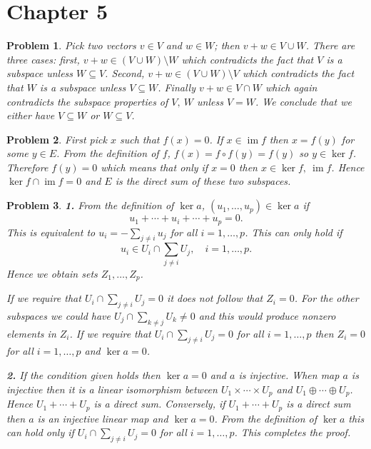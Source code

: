 \documentclass{article}
\newcommand{\subno}[1]{\par\noindent\textbf{#1}}
\DeclareMathOperator{\im}{im}
\theoremstyle{pprop}
\newtheorem{problem}{Problem}[section]
\begin{document}
\section*{Chapter 5}
\begin{problem}
  Pick two vectors $v \in V$ and $w \in W$; then $v+w \in V \cup W$. There are three cases: first, $v+w \in (V \cup W) \setminus W$ which contradicts the 
  fact that $V$ is a subspace unless $W \subseteq V$. Second, $v+w \in (V \cup W) \setminus V$ which contradicts the fact that $W$ is a subspace unless 
  $V \subseteq W$. Finally $v+w \in V \cap W$ which again contradicts the subspace properties of $V, \ W$ unless $V = W$. 
  We conclude that we either have $V \subseteq W$ or $W \subseteq V$.
\end{problem}
\begin{problem}
  First pick $x$ such that $f(x)=0$. If $x \in \im f$ then $x=f(y)$ for some $y \in E$. From the definition of $f$, $f(x)=f \circ f(y)=f(y)$ so $y \in \ker f$.
  Therefore $f(y)=0$ which means that only if $x=0$ then $x \in \ker f, \ \im f$. Hence $\ker f \cap \im f = \qty{0}$ and $E$ is the direct sum of these two 
  subspaces. 
\end{problem}
\begin{problem}
\subno{1.} From the definition of $\ker a$, $(u_1,\ldots,u_p)\in \ker a$ if 
\[
u_1 + \cdots+ u_i + \cdots + u_p = 0.
\]
This is equivalent to $u_i = -\sum_{j \neq i} u_j$ for all $i=1,\ldots,p$. This can only hold if  
\[
  u_i \in U_i \cap \sum_{j \neq i} U_j, \quad i=1,\ldots,p.
\]
Hence we obtain sets $Z_1,\ldots, Z_p$.

If we require that $U_i \cap \sum_{j \neq i} U_j=\qty{0}$ it does not follow that $Z_i=\qty{0}$. For the other subspaces we could have 
$U_j \cap \sum_{k \neq j} U_k \neq \qty{0}$ and this would produce nonzero elements in $Z_i$. If we require that $U_i \cap \sum_{j \neq i} U_j=\qty{0}$ for all $i=1,\ldots,p$ 
then $Z_i=\qty{0}$ for all $i=1,\ldots,p$ and $\ker a=\qty{0}$.
\subno{2.} If the condition given holds then $\ker a=\qty{0}$ and $a$ is injective. When map $a$ is injective then it is a linear isomorphism between
$U_1 \times \cdots \times U_p$ and $U_1 \oplus \cdots \oplus U_p$. Hence $U_1+\cdots+U_p$ is a direct sum. Conversely, if $U_1+\cdots+U_p$ is a direct sum 
then $a$ is an injective linear map and $\ker a=\qty{0}$. From the definition of $\ker a$ this can hold only if $U_i \cap \sum_{j \neq i} U_j=\qty{0}$ for all $i=1,\ldots,p$.
This completes the proof.
\end{problem}
\end{document}
